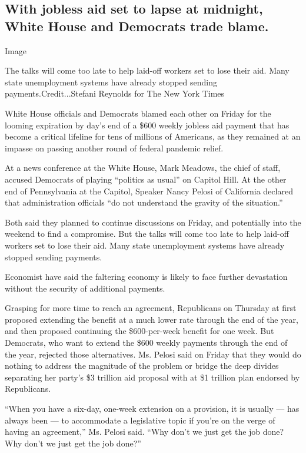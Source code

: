 \hypertarget{with-jobless-aid-set-to-lapse-at-midnight-white-house-and-democrats-trade-blame}{%
\subsection{With jobless aid set to lapse at midnight, White House and
Democrats trade
blame.}\label{with-jobless-aid-set-to-lapse-at-midnight-white-house-and-democrats-trade-blame}}

Image

The talks will come too late to help laid-off workers set to lose their
aid. Many state unemployment systems have already stopped sending
payments.Credit...Stefani Reynolds for The New York Times

White House officials and Democrats blamed each other on Friday for the
looming expiration by day's end of a \$600 weekly jobless aid payment
that has become a critical lifeline for tens of millions of Americans,
as they remained at an impasse on passing another round of federal
pandemic relief.

At a news conference at the White House, Mark Meadows, the chief of
staff, accused Democrats of playing ``politics as usual'' on Capitol
Hill. At the other end of Pennsylvania at the Capitol, Speaker Nancy
Pelosi of California declared that administration officials ``do not
understand the gravity of the situation.''

Both said they planned to continue discussions on Friday, and
potentially into the weekend to find a compromise. But the talks will
come too late to help laid-off workers set to lose their aid. Many state
unemployment systems have already stopped sending payments.

Economist have said the faltering economy is likely to face further
devastation without the security of additional payments.

Grasping for more time to reach an agreement, Republicans on Thursday at
first proposed extending the benefit at a much lower rate through the
end of the year, and then proposed continuing the \$600-per-week benefit
for one week. But Democrats, who want to extend the \$600 weekly
payments through the end of the year, rejected those alternatives. Ms.
Pelosi said on Friday that they would do nothing to address the
magnitude of the problem or bridge the deep divides separating her
party's \$3 trillion aid proposal with at \$1 trillion plan endorsed by
Republicans.

``When you have a six-day, one-week extension on a provision, it is
usually --- has always been --- to accommodate a legislative topic if
you're on the verge of having an agreement,'' Ms. Pelosi said. ``Why
don't we just get the job done? Why don't we just get the job done?''

